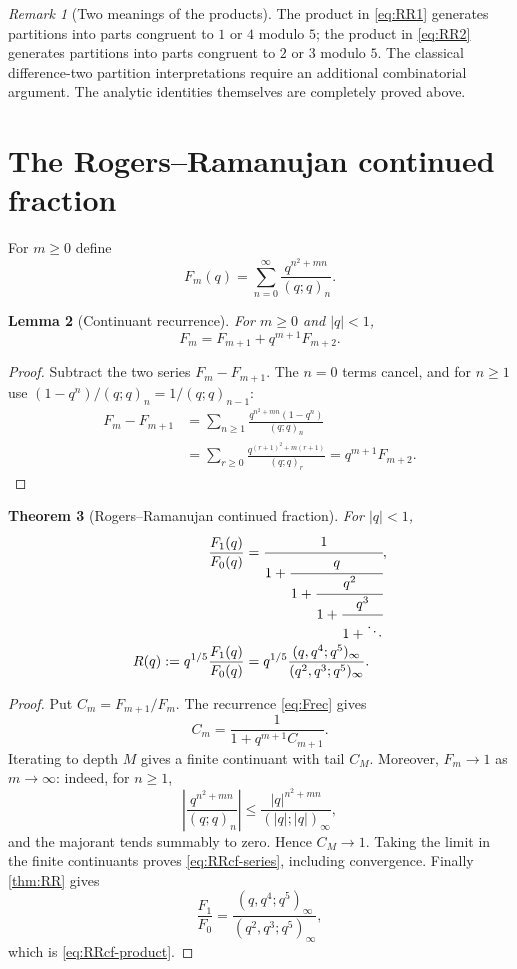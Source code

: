 \documentclass[11pt]{article}
\numberwithin{equation}{section}
\newtheorem{theorem}{Theorem}[section]
\newtheorem{lemma}[theorem]{Lemma}
\theoremstyle{definition}
\theoremstyle{remark}
\newtheorem{remark}[theorem]{Remark}
\begin{document}
\begin{remark}[Two meanings of the products]
The product in \eqref{eq:RR1} generates partitions into parts congruent to
$1$ or $4$ modulo $5$; the product in \eqref{eq:RR2} generates partitions
into parts congruent to $2$ or $3$ modulo $5$.  The classical difference-two
partition interpretations require an additional combinatorial argument.  The
analytic identities themselves are completely proved above.
\end{remark}

\section{The Rogers--Ramanujan continued fraction}

For $m\ge0$ define
\begin{equation}\label{eq:Fm}
F_m(q)=\sum_{n=0}^{\infty}\frac{q^{n^2+mn}}{(q;q)_n}.
\end{equation}

\begin{lemma}[Continuant recurrence]\label{lem:Frec}
For $m\ge0$ and $|q|<1$,
\begin{equation}\label{eq:Frec}
F_m=F_{m+1}+q^{m+1}F_{m+2}.
\end{equation}
\end{lemma}
\begin{proof}
Subtract the two series $F_m-F_{m+1}$.  The $n=0$ terms cancel, and for
$n\ge1$ use $(1-q^n)/(q;q)_n=1/(q;q)_{n-1}$:
\begin{align*}
F_m-F_{m+1}
&=\sum_{n\ge1}\frac{q^{n^2+mn}(1-q^n)}{(q;q)_n}\\
&=\sum_{r\ge0}\frac{q^{(r+1)^2+m(r+1)}}{(q;q)_r}
=q^{m+1}F_{m+2}.
\end{align*}
\end{proof}

\begin{theorem}[Rogers--Ramanujan continued fraction]\label{thm:RRCF}
For $|q|<1$,
\begin{align}
\frac{F_1(q)}{F_0(q)}
&=\cfrac1{1+\cfrac{q}{1+\cfrac{q^2}{1+\cfrac{q^3}{1+\ddots}}}},
\label{eq:RRcf-series}\\
R(q):=q^{1/5}\frac{F_1(q)}{F_0(q)}
&=q^{1/5}
\frac{(q,q^4;q^5)_\infty}{(q^2,q^3;q^5)_\infty}.
\label{eq:RRcf-product}
\end{align}
\end{theorem}
\begin{proof}
Put $C_m=F_{m+1}/F_m$.  The recurrence \eqref{eq:Frec} gives
\begin{equation}\label{eq:Crec}
C_m=\frac1{1+q^{m+1}C_{m+1}}.
\end{equation}
Iterating to depth $M$ gives a finite continuant with tail $C_M$.  Moreover,
$F_m\to1$ as $m\to\infty$: indeed, for $n\ge1$,
\[
\left|\frac{q^{n^2+mn}}{(q;q)_n}\right|
\le\frac{|q|^{n^2+mn}}{(|q|;|q|)_\infty},
\]
and the majorant tends summably to zero.  Hence $C_M\to1$.  Taking the limit
in the finite continuants proves \eqref{eq:RRcf-series}, including
convergence.  Finally \cref{thm:RR} gives
\[
\frac{F_1}{F_0}
=\frac{(q,q^4;q^5)_\infty}{(q^2,q^3;q^5)_\infty},
\]
which is \eqref{eq:RRcf-product}.
\end{proof}
\end{document}

